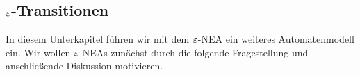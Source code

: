 %         
% 
% 






\subsection{\texorpdfstring{$\varepsilon$}{epsilon}-Transitionen}\label{sec:2.EpsNea}

In diesem Unterkapitel führen wir mit dem $\varepsilon$-NEA ein weiteres Automatenmodell ein. 
Wir wollen $\varepsilon$-NEAs zunächst durch die folgende Fragestellung und anschließende Diskussion motivieren.

